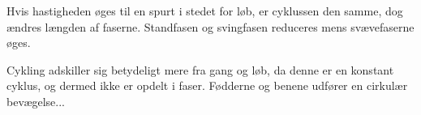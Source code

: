 Hvis hastigheden øges til en spurt i stedet for løb, er cyklussen den samme, dog ændres længden af faserne. Standfasen og svingfasen reduceres mens svævefaserne øges. \citep{Lee1998}

Cykling adskiller sig betydeligt mere fra gang og løb, da denne er en konstant cyklus, og dermed ikke er opdelt i faser. Fødderne og benene udfører en cirkulær bevægelse...




